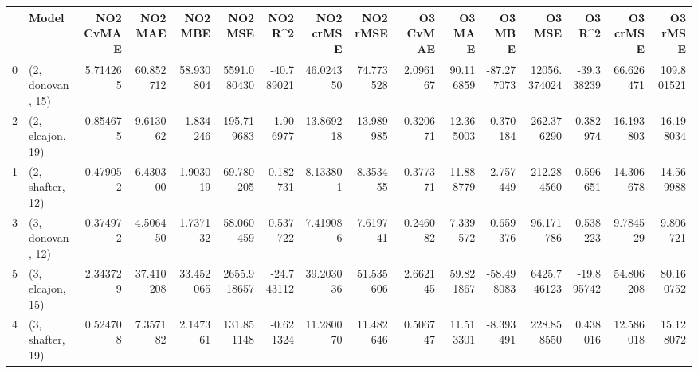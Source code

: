 \begin{tabular}{llrrrrrrrrrrrrrr}
\toprule
{} &             Model &  NO2 CvMAE &    NO2 MAE &    NO2 MBE &      NO2 MSE &    NO2 R\textasciicircum2 &  NO2 crMSE &   NO2 rMSE &  O3 CvMAE &     O3 MAE &     O3 MBE &        O3 MSE &     O3 R\textasciicircum2 &   O3 crMSE &     O3 rMSE \\
\midrule
0 &  (2, donovan, 15) &   5.714265 &  60.852712 &  58.930804 &  5591.080430 & -40.789021 &  46.024350 &  74.773528 &  2.096167 &  90.116859 & -87.277073 &  12056.374024 & -39.338239 &  66.626471 &  109.801521 \\
2 &  (2, elcajon, 19) &   0.854675 &   9.613062 &  -1.834246 &   195.719683 &  -1.906977 &  13.869218 &  13.989985 &  0.320671 &  12.365003 &   0.370184 &    262.376290 &   0.382974 &  16.193803 &   16.198034 \\
1 &  (2, shafter, 12) &   0.479052 &   6.430300 &   1.903019 &    69.780205 &   0.182731 &   8.133801 &   8.353455 &  0.377371 &  11.888779 &  -2.757449 &    212.284560 &   0.596651 &  14.306678 &   14.569988 \\
3 &  (3, donovan, 12) &   0.374972 &   4.506450 &   1.737132 &    58.060459 &   0.537722 &   7.419086 &   7.619741 &  0.246082 &   7.339572 &   0.659376 &     96.171786 &   0.538223 &   9.784529 &    9.806721 \\
5 &  (3, elcajon, 15) &   2.343729 &  37.410208 &  33.452065 &  2655.918657 & -24.743112 &  39.203036 &  51.535606 &  2.662145 &  59.821867 & -58.498083 &   6425.746123 & -19.895742 &  54.806208 &   80.160752 \\
4 &  (3, shafter, 19) &   0.524708 &   7.357182 &   2.147361 &   131.851148 &  -0.621324 &  11.280070 &  11.482646 &  0.506747 &  11.513301 &  -8.393491 &    228.858550 &   0.438016 &  12.586018 &   15.128072 \\
\bottomrule
\end{tabular}
